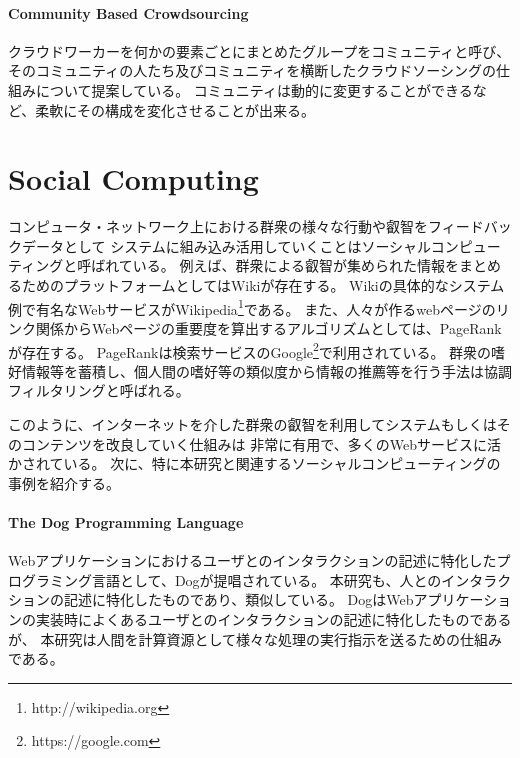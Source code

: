 \paragraph{Community Based
Crowdsourcing}\label{community-based-crowdsourcing}

\mbox{}

クラウドワーカーを何かの要素ごとにまとめたグループをコミュニティと呼び、
そのコミュニティの人たち及びコミュニティを横断したクラウドソーシングの仕組みについて提案している\cite{community-based-crowdsourcing}。
コミュニティは動的に変更することができるなど、柔軟にその構成を変化させることが出来る。

\section{Social Computing}\label{social-computing}

コンピュータ・ネットワーク上における群衆の様々な行動や叡智をフィードバックデータとして
システムに組み込み活用していくことはソーシャルコンピューティングと呼ばれている。
例えば、群衆による叡智が集められた情報をまとめるためのプラットフォームとしてはWiki\cite{wiki-way}が存在する。
Wikiの具体的なシステム例で有名なWebサービスがWikipedia\footnote{http://wikipedia.org}である。
また、人々が作るwebページのリンク関係からWebページの重要度を算出するアルゴリズムとしては、PageRank\cite{pagerank}が存在する。
PageRankは検索サービスのGoogle\footnote{https://google.com}で利用されている。
群衆の嗜好情報等を蓄積し、個人間の嗜好等の類似度から情報の推薦等を行う手法は協調フィルタリングと呼ばれる\cite{collaborative-filtering}。

このように、インターネットを介した群衆の叡智を利用してシステムもしくはそのコンテンツを改良していく仕組みは
非常に有用で、多くのWebサービスに活かされている。
次に、特に本研究と関連するソーシャルコンピューティングの事例を紹介する。

\paragraph{The Dog Programming
Language}\label{the-dog-programming-language}

\mbox{}

Webアプリケーションにおけるユーザとのインタラクションの記述に特化したプログラミング言語として、Dog\cite{dog}が提唱されている。
本研究も、人とのインタラクションの記述に特化したものであり、類似している。
DogはWebアプリケーションの実装時によくあるユーザとのインタラクションの記述に特化したものであるが、
本研究は人間を計算資源として様々な処理の実行指示を送るための仕組みである。

